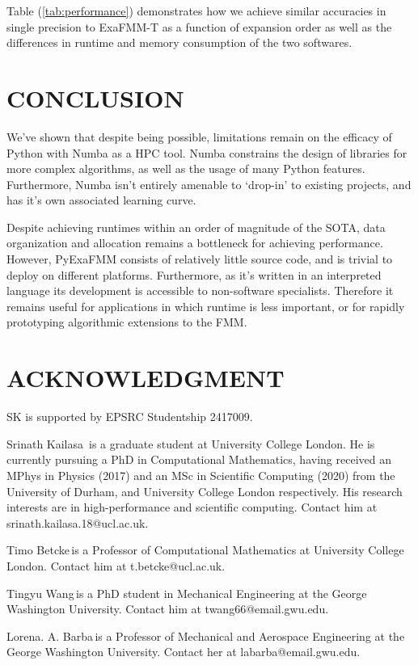 \documentclass{IEEEcsmag}
\begin{document}
Table (\ref{tab:performance}) demonstrates how we achieve similar accuracies in single precision to ExaFMM-T as a function of expansion order as well as the differences in runtime and memory consumption of the two softwares.

\section{CONCLUSION}

We've shown that despite being possible, limitations remain on the efficacy of Python with Numba as a HPC tool. Numba constrains the design of libraries for more complex algorithms, as well as the usage of many Python features. Furthermore, Numba isn't entirely amenable to `drop-in' to existing projects, and has it's own associated learning curve.

Despite achieving runtimes within an order of magnitude of the SOTA, data organization and allocation remains a bottleneck for achieving performance. However, PyExaFMM consists of relatively little source code, and is trivial to deploy on different platforms. Furthermore, as it's written in an interpreted language its development is accessible to non-software specialists. Therefore it remains useful for applications in which runtime is less important, or for rapidly prototyping algorithmic extensions to the FMM.

\section{ACKNOWLEDGMENT}

SK is supported by EPSRC Studentship 2417009.




\begin{IEEEbiography}{Srinath Kailasa}{\,} is a graduate student at University College London. He is currently pursuing a PhD in Computational Mathematics, having received an MPhys in Physics (2017) and an MSc in Scientific Computing (2020) from the University of Durham, and University College London respectively. His research interests are in high-performance and scientific computing. Contact him at srinath.kailasa.18@ucl.ac.uk.
\end{IEEEbiography}

\begin{IEEEbiography}{Timo Betcke}{\,}is a Professor of Computational Mathematics at University College London. Contact him at t.betcke@ucl.ac.uk.
\end{IEEEbiography}

\begin{IEEEbiography}{Tingyu Wang}{\,}is a PhD student in Mechanical Engineering at the George Washington University. Contact him at twang66@email.gwu.edu.
\end{IEEEbiography}

\begin{IEEEbiography}{Lorena. A. Barba}{\,}is a Professor of Mechanical and Aerospace Engineering at the George Washington University.  Contact her at labarba@email.gwu.edu.
\end{IEEEbiography}
\end{document}

